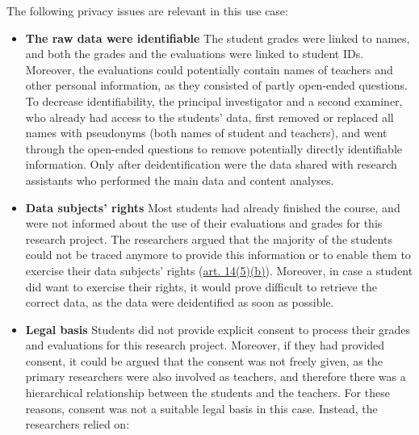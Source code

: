 \documentclass[
]{book}
\providecommand{\tightlist}{%
  \setlength{\itemsep}{0pt}\setlength{\parskip}{0pt}}
\begin{document}
The following privacy issues are relevant in this use case:

\begin{itemize}
\tightlist
\item
  \textbf{The raw data were identifiable}
  The student grades were linked to names, and both the grades and the evaluations
  were linked to student IDs. Moreover, the evaluations could potentially contain
  names of teachers and other personal information, as they consisted of partly
  open-ended questions. To decrease identifiability, the principal investigator and
  a second examiner, who already had access to the students' data, first removed or
  replaced all names with pseudonyms (both names of student and teachers), and went
  through the open-ended questions to remove potentially directly identifiable
  information. Only after deidentification were the data shared with research
  assistants who performed the main data and content analyses.
\item
  \textbf{Data subjects' rights}
  Most students had already finished the course, and were not informed about the
  use of their evaluations and grades for this research project. The researchers
  argued that the majority of the students could not be traced anymore to provide
  this information or to enable them to exercise their data subjects' rights
  (\href{https://gdpr-info.eu/art-14-gdpr/}{art. 14(5)(b)}).
  Moreover, in case a student did want to exercise their rights, it would prove
  difficult to retrieve the correct data, as the data were deidentified as soon as
  possible.
\item
  \textbf{Legal basis}
  Students did not provide explicit consent to process their grades and evaluations
  for this research project. Moreover, if they had provided consent, it could be
  argued that the consent was not freely given, as the primary researchers were
  also involved as teachers, and therefore there was a hierarchical relationship
  between the students and the teachers. For these reasons, consent was not a
  suitable legal basis in this case. Instead, the researchers relied on:


\end{itemize}
\end{document}
